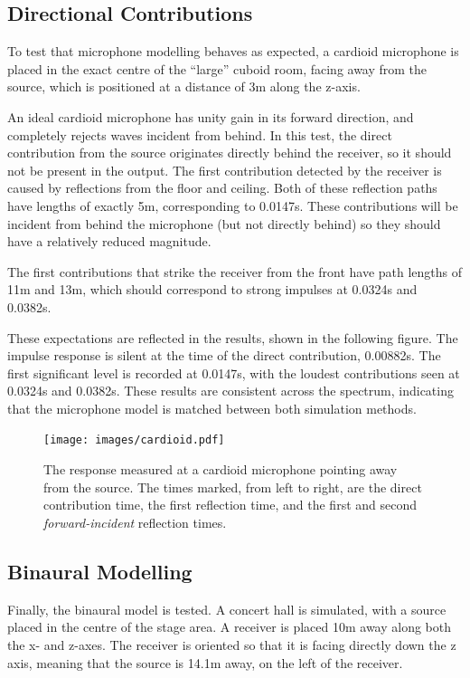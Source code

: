 \documentclass[]{scrreprt}
\begin{document}
\subsection{Directional Contributions}\label{directional-contributions}

To test that microphone modelling behaves as expected, a cardioid
microphone is placed in the exact centre of the ``large'' cuboid room,
facing away from the source, which is positioned at a distance of 3m
along the z-axis.

An ideal cardioid microphone has unity gain in its forward direction,
and completely rejects waves incident from behind. In this test, the
direct contribution from the source originates directly behind the
receiver, so it should not be present in the output. The first
contribution detected by the receiver is caused by reflections from the
floor and ceiling. Both of these reflection paths have lengths of
exactly 5m, corresponding to 0.0147s. These contributions will be
incident from behind the microphone (but not directly behind) so they
should have a relatively reduced magnitude.

The first contributions that strike the receiver from the front have
path lengths of 11m and 13m, which should correspond to strong impulses
at 0.0324s and 0.0382s.

These expectations are reflected in the results, shown in the following
figure\text{ (\ref{fig:cardioid})}. The impulse response is silent at
the time of the direct contribution, 0.00882s. The first significant
level is recorded at 0.0147s, with the loudest contributions seen at
0.0324s and 0.0382s. These results are consistent across the spectrum,
indicating that the microphone model is matched between both simulation
methods.

\begin{figure}[htbp]
\centering
\texttt{[image: images/cardioid.pdf]}
\caption{The response measured at a cardioid microphone pointing away
from the source. The times marked, from left to right, are the direct
contribution time, the first reflection time, and the first and second
\emph{forward-incident} reflection times.\label{fig:cardioid}}
\end{figure}

\subsection{Binaural Modelling}\label{binaural-modelling}

Finally, the binaural model is tested. A concert hall is simulated, with
a source placed in the centre of the stage area. A receiver is placed
10m away along both the x- and z-axes. The receiver is oriented so that
it is facing directly down the z axis, meaning that the source is 14.1m
away, on the left of the receiver.
\end{document}
